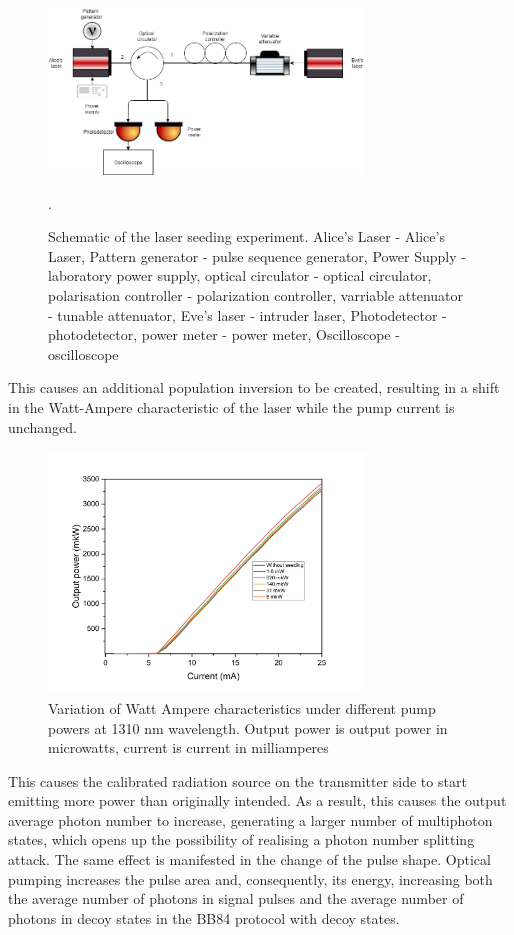 \begin{figure}
    \centering
    \includegraphics[width=0.75\textwidth]{images/1310 experiment.png}
    \caption{Schematic of the laser seeding experiment. Alice's Laser - Alice's Laser, Pattern generator - pulse sequence generator, Power Supply - laboratory power supply, optical circulator - optical circulator, polarisation controller - polarization controller, varriable attenuator - tunable attenuator, Eve's laser - intruder laser, Photodetector - photodetector, power meter - power meter, Oscilloscope - oscilloscope}.
\label{fig:exper 1310 syn}
\end{figure}
This causes an additional population inversion to be created, resulting in a shift in the Watt-Ampere characteristic of the laser while the pump current is unchanged.
\begin{figure}
    \centering
    \includegraphics[width=0.75\textwidth]{images/ватт ампер для диссера.png}
    \caption{Variation of Watt Ampere characteristics under different pump powers at 1310 nm wavelength. Output power is output power in microwatts, current is current in milliamperes}
    \label{fig:watt-amp syn}
\end{figure}
This causes the calibrated radiation source on the transmitter side to start emitting more power than originally intended. As a result, this causes the output average photon number to increase, generating a larger number of multiphoton states, which opens up the possibility of realising a photon number splitting attack. The same effect is manifested in the change of the pulse shape. Optical pumping increases the pulse area and, consequently, its energy, increasing both the average number of photons in signal pulses and the average number of photons in decoy states in the BB84 protocol with decoy states.

